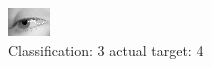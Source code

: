 \begin{figure}[h!]
\begin{center}
\includegraphics[width=0.60\columnwidth]{figures/ID2967_class_3_target_4.png}
\end{center}
\caption{ Classification: 3 actual target: 4}
\label{fig:ID2967_class_3_target_4}
\end{figure}
